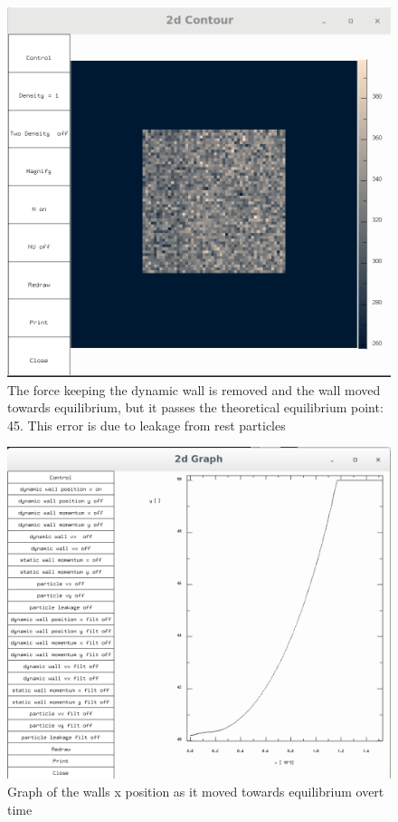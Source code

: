 \documentclass{article}
\begin{document}
\begin{figure}[H]
\includegraphics[scale=0.35]{A1p3.png}
\caption{\label{fig} The force keeping the dynamic wall is removed and the wall moved towards equilibrium, but it passes the theoretical equilibrium point: 45. This error is due to leakage from rest particles}
\end{figure}

\begin{figure}[H]
\includegraphics[scale=0.35]{A1p4.png}
\caption{\label{fig} Graph of the walls x position as it moved towards equilibrium overt time}
\end{figure}
\end{document}

